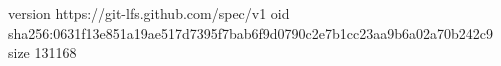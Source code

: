 version https://git-lfs.github.com/spec/v1
oid sha256:0631f13e851a19ae517d7395f7bab6f9d0790c2e7b1cc23aa9b6a02a70b242c9
size 131168
